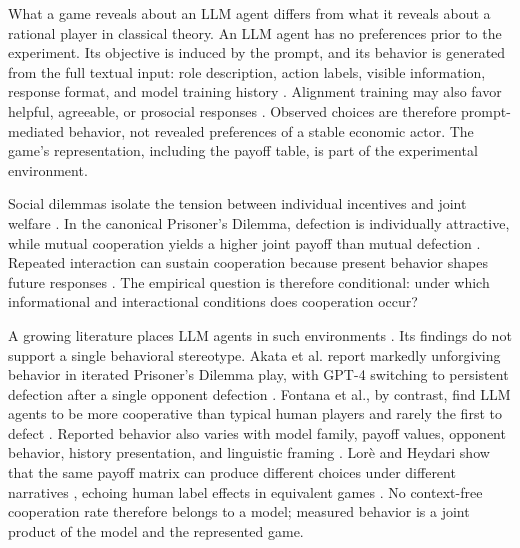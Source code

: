 \documentclass[11pt,a4paper]{article}
\makeatletter
\renewcommand\subsection{\@startsection{subsection}{2}{\z@}{9pt}{6pt}{\normalfont\fontsize{12pt}{14pt}\bfseries}}
\makeatother
\begin{document}
What a game reveals about an LLM agent differs from what it reveals about a rational player in classical theory. An LLM agent has no preferences prior to the experiment. Its objective is induced by the prompt, and its behavior is generated from the full textual input: role description, action labels, visible information, response format, and model training history \cite{horton2023large}. Alignment training may also favor helpful, agreeable, or prosocial responses \cite{ouyang2022training,bai2022constitutional}. Observed choices are therefore prompt-mediated behavior, not revealed preferences of a stable economic actor. The game's representation, including the payoff table, is part of the experimental environment.

\subsection{LLM Behavior in Social Dilemmas}
\label{sec:theory-dilemmas}

Social dilemmas isolate the tension between individual incentives and joint welfare \cite{dawes1980social,kollock1998social}. In the canonical Prisoner's Dilemma, defection is individually attractive, while mutual cooperation yields a higher joint payoff than mutual defection \cite{luce1957games,rapoport1965prisoners}. Repeated interaction can sustain cooperation because present behavior shapes future responses \cite{axelrod1984evolution,dalbo2019strategy}. The empirical question is therefore conditional: under which informational and interactional conditions does cooperation occur?

A growing literature places LLM agents in such environments \cite{fontana2024nicer,akata2025playing,han2024static,willis2025systems}. Its findings do not support a single behavioral stereotype. Akata et al. report markedly unforgiving behavior in iterated Prisoner's Dilemma play, with GPT-4 switching to persistent defection after a single opponent defection \cite{akata2025playing}. Fontana et al., by contrast, find LLM agents to be more cooperative than typical human players and rarely the first to defect \cite{fontana2024nicer}. Reported behavior also varies with model family, payoff values, opponent behavior, history presentation, and linguistic framing \cite{lore2023strategic,herr2024strategic,pal2026strategies}. Lor\`e and Heydari show that the same payoff matrix can produce different choices under different narratives \cite{lore2023strategic}, echoing human label effects in equivalent games \cite{liberman2004name}. No context-free cooperation rate therefore belongs to a model; measured behavior is a joint product of the model and the represented game.
\end{document}
